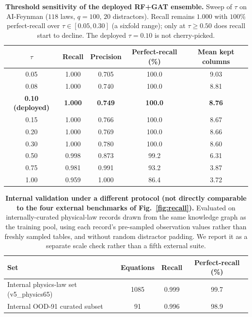 \documentclass[11pt]{article}
\begin{document}
\begin{table}[h!]\centering
\caption{\textbf{Threshold sensitivity of the deployed RF+GAT ensemble.} Sweep
of $\tau$ on AI-Feynman ($118$ laws, $q=100$, $20$ distractors). Recall remains
$1.000$ with $100\%$ perfect-recall over $\tau\in[0.05, 0.30]$ (a sixfold range);
only at $\tau\geq 0.50$ does recall start to decline. The deployed
$\tau=0.10$ is not cherry-picked.}
\label{tab:tau-sensitivity}
\footnotesize
\begin{tabular}{ccccc}
\toprule
$\tau$ & Recall & Precision & Perfect-recall (\%) & Mean kept columns \\
\midrule
0.05 & 1.000 & 0.705 & 100.0 & 9.03 \\
0.08 & 1.000 & 0.740 & 100.0 & 8.81 \\
\textbf{0.10 (deployed)} & \textbf{1.000} & \textbf{0.749} & \textbf{100.0} & \textbf{8.76} \\
0.15 & 1.000 & 0.766 & 100.0 & 8.67 \\
0.20 & 1.000 & 0.769 & 100.0 & 8.66 \\
0.30 & 1.000 & 0.780 & 100.0 & 8.60 \\
0.50 & 0.998 & 0.873 &  99.2 & 6.31 \\
0.75 & 0.981 & 0.991 &  93.2 & 3.87 \\
1.00 & 0.959 & 1.000 &  86.4 & 3.72 \\
\bottomrule
\end{tabular}
\end{table}

\begin{table}[h!]\centering
\caption{\textbf{Internal validation under a different protocol (not directly
comparable to the four external benchmarks of Fig.~\ref{fig:recall}).}
Evaluated on internally-curated physical-law records drawn from the same
knowledge graph as the training pool, using each record's pre-sampled
observation values rather than freshly sampled tables, and without random
distractor padding. We report it as a separate scale check rather than a fifth
external suite.}
\label{tab:internal-validation}
\footnotesize
\begin{tabular}{lccc}
\toprule
Set & Equations & Recall & Perfect-recall (\%) \\
\midrule
Internal physics-law set (v5\_physics65) & 1085 & 0.999 & 99.7 \\
Internal OOD-91 curated subset           &   91 & 0.996 & 98.9 \\
\bottomrule
\end{tabular}
\end{table}
\end{document}
